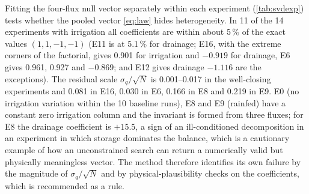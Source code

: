 \documentclass[preprint,12pt,authoryear]{elsarticle}
\begin{document}
Fitting the four-flux null vector separately within each experiment (\cref{tab:svdexp}) tests whether the pooled vector \cref{eq:law} hides heterogeneity. In 11 of the 14 experiments with irrigation all coefficients are within about 5\,\% of the exact values $(1,1,-1,-1)$ (E11 is at 5.1\,\% for drainage; E16, with the extreme corners of the factorial, gives 0.901 for irrigation and $-0.919$ for drainage, E6 gives 0.961, 0.927 and $-0.869$; and E12 gives drainage $-1.116$ are the exceptions). The residual scale $\sigma_q/\sqrt N$ is 0.001--0.017 in the well-closing experiments and 0.081 in E16, 0.030 in E6, 0.166 in E8 and 0.219 in E9. E0 (no irrigation variation within the 10 baseline runs), E8 and E9 (rainfed) have a constant zero irrigation column and the invariant is formed from three fluxes; for E8 the drainage coefficient is $+15.5$, a sign of an ill-conditioned decomposition in an experiment in which storage dominates the balance, which is a cautionary example of how an unconstrained search can return a numerically valid but physically meaningless vector. The method therefore identifies its own failure by the magnitude of $\sigma_q/\sqrt N$ and by physical-plausibility checks on the coefficients, which is recommended as a rule.
\end{document}
